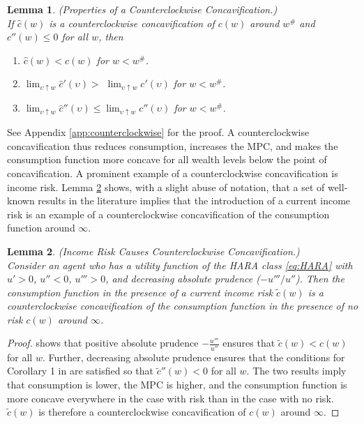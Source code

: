 \documentclass[titlepage]{\econtex}
\newtheorem{lemma}{Lemma}
\begin{document}
  \begin{lemma}\label{lem:counterclockwise}(Properties of a Counterclockwise Concavification.) \\
    If $\hat{c}(w)$ is a counterclockwise concavification of $c(w)$ around $w^{\#}$ and $c''(w) \leq 0$ for all $w$, then
    \begin{enumerate}
    \item $\hat{c}(w) < c(w)$ for  $w < w^{\#}$.
    \item $\lim_{\upsilon \uparrow w} \hat{c}'(\upsilon) >$ $\lim_{\upsilon \uparrow w} c'(\upsilon)$ for $w < w^{\#}$.
    \item $\lim_{\upsilon \uparrow w} \hat{c}''(\upsilon) \leq \lim_{\upsilon \uparrow w} c''(\upsilon)$ for $w < w^{\#}$.
    \end{enumerate}
  \end{lemma}
  \noindent See Appendix \ref{app:counterclockwise} for the proof. A counterclockwise concavification thus reduces consumption, increases the MPC, and makes the consumption function more concave for all wealth levels below the point of concavification. A prominent example of a counterclockwise concavification is income risk. Lemma \ref{lem:ccrisk} shows, with a slight abuse of notation, that a set of well-known results in the literature implies that the introduction of a current income risk is an example of a counterclockwise concavification of the consumption function around $\infty$. 

  \begin{lemma}\label{lem:ccrisk}\textit{(Income Risk Causes Counterclockwise Concavification.)} \\
    Consider an agent who has a utility function of the HARA class \eqref{eq:HARA}
    with $u' > 0$, $u'' < 0$, $u''' > 0$, and decreasing absolute prudence ($-u'''/u''$). Then the consumption function in the presence of a current income risk $\tilde{c}(w)$ is a counterclockwise concavification of the consumption function in the presence of no risk $c(w)$ around $\infty$. 
  \end{lemma}
  \begin{proof}
    \citet{kimball:smallandlarge} shows that positive absolute prudence $-\frac{u'''}{u''}$ ensures that $\tilde{c}(w) < c(w)$ for all $w$. Further, decreasing absolute prudence ensures that the conditions for Corollary 1 in \citet{carroll&kimball:concavity} are satisfied so that $\tilde{c}''(w) < 0$ for all $w$. The two results imply that consumption is lower, the MPC is higher, and the consumption function is more concave everywhere in the case with risk than in the case with no risk. $\tilde{c}(w)$ is therefore a counterclockwise concavification of $c(w)$ around $\infty$. 
  \end{proof}
\end{document}
